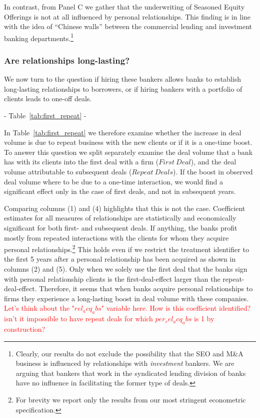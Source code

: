 In contrast, from Panel C we gather that the underwriting of Seasoned Equity Offerings is not at all influenced by personal relationships. This finding is in line with the idea of ``Chinese walls'' between the commercial lending and investment banking departments.\footnote{Clearly, our results do not exclude the possibility that the SEO and M\&A business is influenced by relationships with \emph{investment} bankers. We are arguing that bankers that work in the syndicated lending division of banks have no influence in facilitating the former type of deals.} 

\subsubsection{Are relationships long-lasting?}

We now turn to the question if hiring these bankers allows banks to establish long-lasting relationships to borrowers, or if hiring bankers with a portfolio of clients leads to one-off deals.

\begin{center} - Table~\ref{tab:first_repeat} - \end{center}

In Table~\ref{tab:first_repeat} we therefore examine whether the increase in deal volume is due to repeat business with the new clients or if it is a one-time boost. To answer this question we split separately examine the deal volume that a bank has with its clients into the first deal with a firm ($First~Deal$), and the deal volume attributable to subsequent deals ($Repeat~Deals$). If the boost in observed deal volume where to be due to a one-time interaction, we would find a significant effect only in the case of first deals, and not in subsequent years. 

Comparing columns (1) and (4) highlights that this is not the case. Coefficient estimates for all measures of relationships are statistically and economically significant for both first- and subsequent deals. If anything, the banks profit mostly from repeated interactions with the clients for whom they acquire personal relationships.\footnote{For brevity we report only the results from our most stringent econometric specification.} This holds even if we restrict the treatment identifier to the first 5 years after a personal relationship has been acquired as shown in columns (2) and (5). Only when we solely use the first deal that the banks sign with personal relationship clients is the first-deal-effect larger than the repeat-deal-effect. Therefore, it seems that when banks acquire personal relationships to firms they experience a long-lasting boost in deal volume with these companies. \textcolor{red}{Let's think about the "$rel_acq_abs$" variable here. How is this coefficient identified? isn't it impossible to have repeat deals for which $per_rel_acq_abs$ is 1 by construction? }

